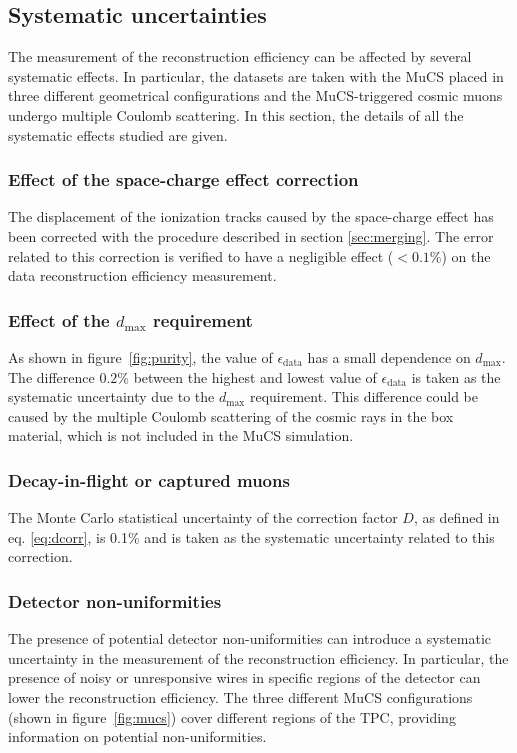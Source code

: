 \documentclass[a4paper,11pt]{article}
\begin{document}
\subsection{Systematic uncertainties}\label{sec:sys}
The measurement of the reconstruction efficiency can be affected by several systematic effects. In particular, the datasets are taken with the MuCS placed in three different geometrical configurations and the MuCS-triggered cosmic muons undergo multiple Coulomb scattering. In this section, the details of all the systematic effects studied are given.

\subsubsection{Effect of the space-charge effect correction}
The displacement of the ionization tracks caused by the space-charge effect has been corrected with the procedure described in section \ref{sec:merging}. The error related to this correction is verified to have a negligible effect ($<0.1\%$) on the data reconstruction efficiency measurement.

\subsubsection{Effect of the $d_{\mathrm{max}}$ requirement}

As shown in figure~\ref{fig:purity}, the value of $\epsilon_{\mathrm{data}}$ has a small dependence on $d_{\mathrm{max}}$. The difference $0.2\%$ between the highest and lowest value of $\epsilon_{\mathrm{data}}$ is taken as the systematic uncertainty due to the $d_{\mathrm{max}}$ requirement. This difference could be caused by the multiple Coulomb scattering of the cosmic rays in the box material, which is not included in the MuCS simulation.

\subsubsection{Decay-in-flight or captured muons}\label{sec:dif}
The Monte Carlo statistical uncertainty of the correction factor $D$, as defined in eq. \eqref{eq:dcorr}, is 0.1\% and is taken as the systematic uncertainty related to this correction.

\subsubsection{Detector non-uniformities}\label{sec:wires}
The presence of potential detector non-uniformities can introduce a systematic uncertainty in the measurement of the reconstruction efficiency. In particular, the presence of noisy or unresponsive wires in specific regions of the detector can lower the reconstruction efficiency. The three different MuCS configurations (shown in figure~\ref{fig:mucs}) cover different regions of the TPC, providing information on potential non-uniformities.
\end{document}
